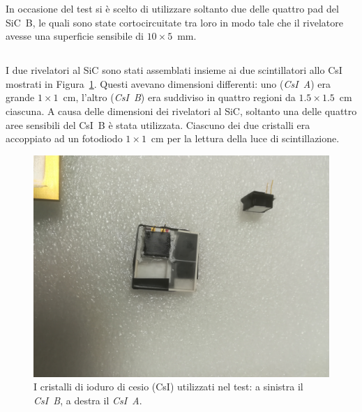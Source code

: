 In occasione del test si è scelto di utilizzare soltanto due delle quattro pad del SiC~B, le quali sono state cortocircuitate tra loro in modo tale che il rivelatore avesse una superficie sensibile di $10 \times 5$~mm.







\subsection{}


I due rivelatori al SiC sono stati assemblati insieme ai due scintillatori allo CsI mostrati in Figura~\ref{fig:csi}. 
Questi avevano dimensioni differenti: uno (\emph{CsI~A}) era grande $1 \times 1$~cm, l'altro (\emph{CsI~B}) era suddiviso in quattro regioni da $1.5 \times 1.5$~cm ciascuna. 
A causa delle dimensioni dei rivelatori al SiC, soltanto una delle quattro aree sensibili del CsI~B è stata utilizzata.
Ciascuno dei due cristalli era accoppiato ad un fotodiodo $1 \times 1$~cm per la lettura della luce di scintillazione. 


\begin{figure} [!t]
	\centering
	\includegraphics[width=\textwidth, keepaspectratio]{Grafici/csi.jpg}
	\caption{I cristalli di ioduro di cesio (CsI) utilizzati nel test: a sinistra il \emph{CsI~B}, a destra il \emph{CsI~A}.} \label{fig:csi}
\end{figure}



